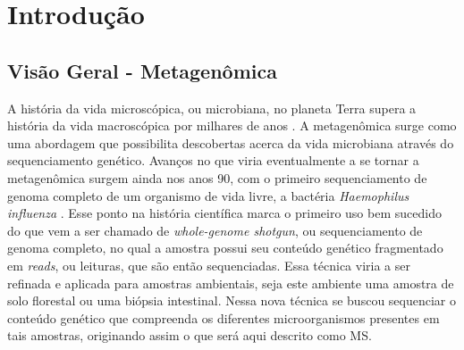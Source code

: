 \documentclass[
	12pt,				%
	oneside,			%
	a4paper,			%
	chapter=TITLE,		%
	section=TITLE,		%
	english,			%
	brazil				%
	]{abntex2}
\begin{document}
{%
	\hypersetup{hidelinks}
	\listoffigures*
	\cleardoublepage



	\imprimirlistadesiglas


	\tableofcontents*
	\cleardoublepage

}%


\textual

\chapter{Introdução}\label{intro}

\section{Visão Geral - Metagenômica}\label{visuxe3o-geral---metagenuxf4mica}

A história da vida microscópica, ou microbiana, no planeta Terra supera a história da vida macroscópica por milhares de anos \autocite{magnabosco2024}. A metagenômica surge como uma abordagem que possibilita descobertas acerca da vida microbiana através do sequenciamento genético. Avanços no que viria eventualmente a se tornar a metagenômica surgem ainda nos anos 90, com o primeiro sequenciamento de genoma completo de um organismo de vida livre, a bactéria \emph{Haemophilus influenza} \autocite{wooley2010}. Esse ponto na história científica marca o primeiro uso bem sucedido do que vem a ser chamado de \emph{whole-genome shotgun}, ou sequenciamento de genoma completo, no qual a amostra possui seu conteúdo genético fragmentado em \emph{reads}, ou leituras, que são então sequenciadas. Essa técnica viria a ser refinada e aplicada para amostras ambientais, seja este ambiente uma amostra de solo florestal ou uma biópsia intestinal. Nessa nova técnica se buscou sequenciar o conteúdo genético que compreenda os diferentes microorganismos presentes em tais amostras, originando assim o que será aqui descrito como \gls{MS}.
\end{document}
